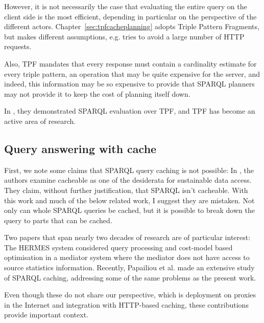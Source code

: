 However, it is not necessarily the case that evaluating the entire
query on the client side is the most efficient, depending in
particular on the perspective of the different
actors. Chapter~\ref{sec:tpfcacheplanning} adopts Triple Pattern
Fragments, but makes different assumptions, e.g. tries to avoid a
large number of HTTP requests. 

Also, TPF mandates that every response must contain a cardinality
estimate for every triple pattern, an operation that may be quite
expensive for the server, and
indeed, this information may be so expensive to provide that SPARQL
planners may not provide it to keep the cost of planning itself
down. 

In \cite{verborgh2014querying}, they demonstrated SPARQL evaluation
over TPF, and TPF has become an active area of research.

\subsection{Query answering with cache}

First, we note some claims that SPARQL query caching is not possible:
In \cite{hogan2014paths}, the authors examine cacheable as one of the
desiderata for sustainable data access. They claim, without further
justification, that SPARQL isn't cacheable. With this work and much of
the below related work, I suggest they are mistaken. Not only can
whole SPARQL queries be cached, but it is possible to break down the
query to parts that can be cached.

Two papers that span nearly two decades of research are of particular
interest: The HERMES system \cite{adali1996query} considered query
processing and cost-model based optimisation in a mediator system
where the mediator does not have access to source statistics
information. Recently, Papailiou et al. \cite{papailiou2015graph}
made an extensive study of SPARQL caching, addressing some of the same
problems as the present work.

Even though these do not share our perspective, which is deployment on
proxies in the Internet and integration with HTTP-based caching, these
contributions provide important context. 

